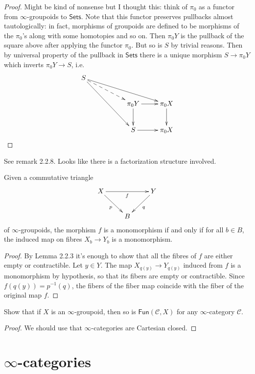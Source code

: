 \begin{proof}
Might be kind of nonsense but I thought this:
think of $\pi_0$ as a functor from  $\infty$-groupoids
to $\mathsf{Sets}$. Note that this functor
preserves pullbacks almost tautologically:
in fact, morphisms of groupoids are defined
to be morphisms of the $\pi_0$'s along
with some homotopies and so on. Then
$\pi_0Y$ is the pullback of the square above
after applying the functor $\pi_0$.
But so is $S$ by trivial reasons.
Then by universal property of the pullback
in $\mathsf{Sets}$ there is a unique morphism
$S \to \pi_0Y$ which inverts $\pi_0Y \to S$,
i.e.
$$
\xymatrix{
S \ar[rrrd] \ar@{-->}[rrd] \ar[rrdd] & & \\
& & \pi_0Y \ar[d] \ar[r] & \pi_0X \ar[d] \\
& & S \ar[r] & \pi_0X
}
$$
\end{proof}

\noindent
See remark 2.2.8. Looks like there
is a factorization structure involved.

\begin{exercise}[2.8]
\label{exercise-2.8}
Given a commutative triangle
$$
\xymatrix{
X \ar[rd]_{p} \ar[rr]_{f} && Y \ar[dl]^{q} \\
& B
}
$$
of $\infty$-groupoids, the morphism $f$ is a monomorphism
if and only if for all $b \in B$, the
induced map on fibres $X_b \to Y_b$ is a monomorphism.
\end{exercise}

\begin{proof}
By Lemma 2.2.3 it's enough to show that all the fibres of
$f$ are either empty or contractible.
Let $y \in Y$. The map $X_{q(y)}\to Y_{q(y)}$ induced from $f$ 
is a monomorphism by hypothesis, so that its fibers
are empty or contractible. Since $f(q(y))=p^{-1}(q)$,
the fibers of the fiber map coincide with the fiber of the 
original map $f$.
\end{proof}

\begin{exercise}[2.9]
\label{exercise-2.9}
Show that if $X$ is an $\infty$-groupoid,
then so is $\mathsf{Fun}(\mathcal{C},X)$ 
for any $\infty$-category $\mathcal{C}$.
\end{exercise}

\begin{proof}
We should use that
$\infty$-categories are Cartesian closed.
\end{proof}

\section{$\infty$-categories}
\label{section-infty-categories}

